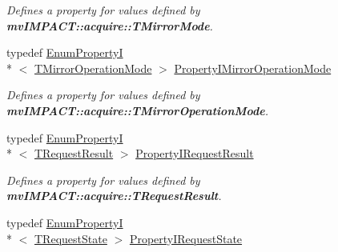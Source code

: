 \begin{DoxyCompactItemize}
\begin{DoxyCompactList}\small\item\em Defines a property for values defined by {\bfseries mv\+I\+M\+P\+A\+C\+T\+::acquire\+::\+T\+Mirror\+Mode}. \end{DoxyCompactList}\item 
\hypertarget{group___common_interface_gaeb7e2fadc87b5bf53e5ba09c3255a276}{typedef \hyperlink{classmv_i_m_p_a_c_t_1_1acquire_1_1_enum_property_i}{Enum\+Property\+I}\\*
$<$ \hyperlink{group___common_interface_ga5bb7986788cc889f815644ba1dab1c46}{T\+Mirror\+Operation\+Mode} $>$ \hyperlink{group___common_interface_gaeb7e2fadc87b5bf53e5ba09c3255a276}{Property\+I\+Mirror\+Operation\+Mode}}\label{group___common_interface_gaeb7e2fadc87b5bf53e5ba09c3255a276}

\begin{DoxyCompactList}\small\item\em Defines a property for values defined by {\bfseries mv\+I\+M\+P\+A\+C\+T\+::acquire\+::\+T\+Mirror\+Operation\+Mode}. \end{DoxyCompactList}\item 
\hypertarget{group___common_interface_ga1589b24b307be9af82ada97e4588a6bd}{typedef \hyperlink{classmv_i_m_p_a_c_t_1_1acquire_1_1_enum_property_i}{Enum\+Property\+I}\\*
$<$ \hyperlink{group___common_interface_gab6148762ea638f8eabbabfc9468b0d4c}{T\+Request\+Result} $>$ \hyperlink{group___common_interface_ga1589b24b307be9af82ada97e4588a6bd}{Property\+I\+Request\+Result}}\label{group___common_interface_ga1589b24b307be9af82ada97e4588a6bd}

\begin{DoxyCompactList}\small\item\em Defines a property for values defined by {\bfseries mv\+I\+M\+P\+A\+C\+T\+::acquire\+::\+T\+Request\+Result}. \end{DoxyCompactList}\item 
\hypertarget{group___common_interface_gaa47cf118ef2a24f22680d3a3b2fcdf60}{typedef \hyperlink{classmv_i_m_p_a_c_t_1_1acquire_1_1_enum_property_i}{Enum\+Property\+I}\\*
$<$ \hyperlink{group___common_interface_gacaa15d9102d56c38e659c31c678a640d}{T\+Request\+State} $>$ \hyperlink{group___common_interface_gaa47cf118ef2a24f22680d3a3b2fcdf60}{Property\+I\+Request\+State}}\label{group___common_interface_gaa47cf118ef2a24f22680d3a3b2fcdf60}


\end{DoxyCompactItemize}
